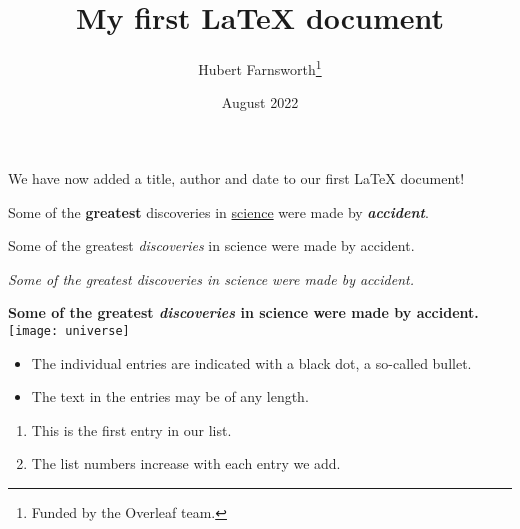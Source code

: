 \documentclass[12pt, letterpaper]{article}
\title{My first LaTeX document}
\author{Hubert Farnsworth\thanks{Funded by the Overleaf team.}}
\date{August 2022}
\begin{document}
    \maketitle
    We have now added a title, author and date to our first \LaTeX{} document!

    Some of the \textbf{greatest}
    discoveries in \underline{science}
    were made by \textbf{\textit{accident}}.

    Some of the greatest \emph{discoveries} in science
    were made by accident.

    \textit{Some of the greatest \emph{discoveries}
    in science were made by accident.}

    \textbf{Some of the greatest \emph{discoveries}
    in science were made by accident.}
    \texttt{[image: universe]}

    \begin{itemize}
        \item The individual entries are indicated with a black dot, a so-called bullet.
        \item The text in the entries may be of any length.
    \end{itemize}

    \begin{enumerate}
        \item This is the first entry in our list.
        \item The list numbers increase with each entry we add.
    \end{enumerate}
\end{document}
